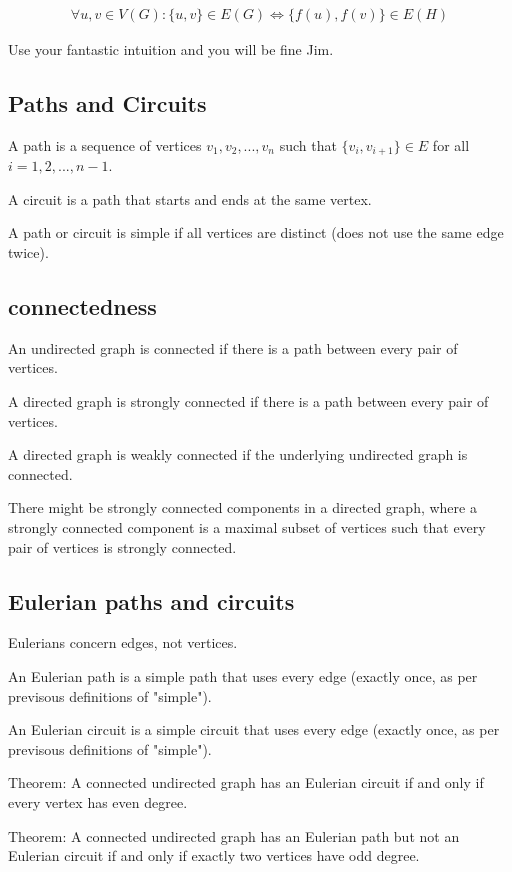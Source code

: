 \documentclass{article}
\begin{document}
\begin{align*}
    \forall u, v \in V(G) : \{u, v\} \in E(G) \iff \{f(u), f(v)\} \in E(H)
\end{align*}

Use your fantastic intuition and you will be fine Jim.

\subsection{Paths and Circuits}

A path is a sequence of vertices $v_1, v_2, ..., v_n$ such that $\{v_i, v_{i+1}\} \in E$ for all $i = 1, 2, ..., n-1$.

A circuit is a path that starts and ends at the same vertex.

A path or circuit is simple if all vertices are distinct (does not use the same edge twice).

\subsection{connectedness}

An undirected graph is connected if there is a path between every pair of vertices.

A directed graph is strongly connected if there is a path between every pair of vertices.

A directed graph is weakly connected if the underlying undirected graph is connected.

There might be strongly connected components in a directed graph, where a strongly connected component is a maximal subset of vertices such that every pair of vertices is strongly connected.

\subsection{Eulerian paths and circuits}

Eulerians concern edges, not vertices.

An Eulerian path is a simple path that uses every edge (exactly once, as per previsous definitions of "simple").

An Eulerian circuit is a simple circuit that uses every edge (exactly once, as per previsous definitions of "simple").

Theorem: A connected undirected graph has an Eulerian circuit if and only if every vertex has even degree.

Theorem: A connected undirected graph has an Eulerian path but not an Eulerian circuit if and only if exactly two vertices have odd degree.
\end{document}
